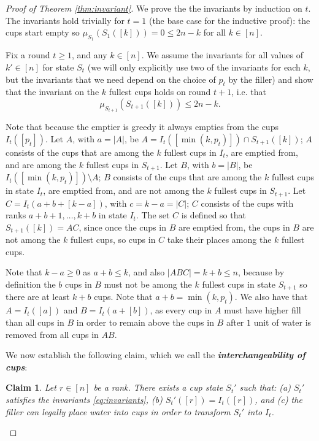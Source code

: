 \documentclass[twocolumn]{article}[10pt]
\newcommand{\defn}[1]{{\textit{\textbf{\boldmath #1}}}\xspace}
\newtheorem{clm}{Claim}
\begin{document}
\begin{proof}[Proof of Theorem \ref{thm:invariant}]
We prove the the invariants by induction on $t$.
The invariants hold trivially for $t=1$ (the base case for the inductive proof): 
the cups start empty so $\mu_{S_1}(S_1([k])) = 0 \le 2n-k$ for all $k \in [n]$.

Fix a round $t \ge 1$, and any $k \in [n]$. We assume the invariants for all
values of $k' \in[n]$ for state $S_t$ (we will only explicitly use two of the
invariants for each $k$, but the invariants that we need depend on the
choice of $p_t$ by the filler) and show that
the invariant on the $k$ fullest cups holds on round $t+1$, i.e. that
$$\mu_{S_{t+1}}(S_{t+1}([k])) \le 2n-k.$$

Note that because the emptier is greedy it always empties from the cups $I_t([p_t])$.
Let $A$, with $a=|A|$, be $A = I_t([\min(k, p_t)]) \cap S_{t+1}([k])$; $A$
consists of the cups that are among the $k$ fullest cups in $I_t$, are emptied from, and
are among the $k$ fullest cups in $S_{t+1}$.
Let $B$, with $b=|B|$, be $I_t([\min(k, p_t)]) \setminus A$; $B$ consists of
the cups that are among the $k$ fullest cups in state $I_t$, are emptied from,
and are not among the $k$ fullest cups in $S_{t+1}$. 
Let $C = I_t(a+b+[k-a])$, with $c=k-a = |C|$; $C$ consists of the cups with ranks $a + b + 1, \ldots, k + b$ in state $I_t$. The set $C$ is defined so that $S_{t+1}([k]) = AC$, since once the cups in $B$
are emptied from, the cups in $B$ are not among the $k$ fullest cups, so
cups in $C$ take their places among the $k$ fullest cups.

Note that $k-a \ge 0$ as $a+b \le k$, and also $|ABC| = k+b \le n$, because by
definition the $b$ cups in $B$ must not be among the $k$ fullest cups in state
$S_{t+1}$ so there are at least $k+b$ cups. 
Note that $a + b = \min(k, p_t)$. We also have that $A = I_t([a])$ and $B =
I_t(a+[b])$, as every cup in $A$ must have higher fill than all cups in $B$ in
order to remain above the cups in $B$ after $1$ unit of water is removed from
all cups in $AB$.

We now establish the following claim, which we call the \defn{interchangeability of cups}:
\begin{clm}
  \label{clm:interchangable}
  Let $r \in [n]$ be a rank. There exists a cup state $S_t'$ such that: (a) $S_t'$ satisfies the invariants \eqref{eq:invariants}, (b) $S_t'([r]) = I_t([r])$, and (c) the filler can legally place water into cups in order to transform $S_t'$ into $I_t$. 
  

\end{clm}
\end{proof}
\end{document}

